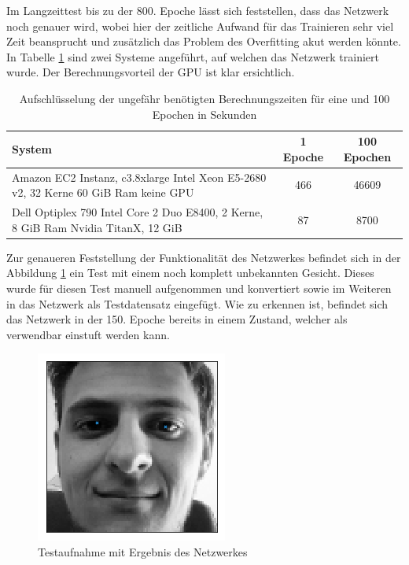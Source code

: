 \noindent
Im Langzeittest bis zu der 800. Epoche lässt sich feststellen, dass das Netzwerk noch genauer wird, wobei hier der zeitliche Aufwand für das Trainieren sehr viel Zeit beansprucht und zusätzlich das Problem des Overfitting akut werden könnte. 
In Tabelle \ref{tab:time} sind zwei Systeme angeführt, auf welchen das Netzwerk trainiert wurde. 
Der Berechnungsvorteil der GPU ist klar ersichtlich. 
\begin{table}[htb]%
\centering
\begin{tabular}{p{7.5cm} c c}
System & 1 Epoche & 100 Epochen \\ 
\hline 
Amazon EC2 Instanz, c3.8xlarge \newline Intel Xeon E5-2680 v2, 32 Kerne 60 GiB Ram \newline keine GPU & 466 & 46609 \\ 
\hline 
Dell Optiplex 790 \newline Intel Core 2 Duo E8400, 2 Kerne, 8 GiB Ram \newline Nvidia TitanX, 12 GiB & 87 & 8700 \\ 
\end{tabular} 
\caption{Aufschlüsselung der ungefähr benötigten Berechnungszeiten für eine und 100 Epochen in Sekunden}
\label{tab:time}
\end{table} \phantom \newline

\noindent
Zur genaueren Feststellung der Funktionalität des Netzwerkes befindet sich in der Abbildung \ref{fig:meTest} ein Test mit einem noch komplett unbekannten Gesicht. 
Dieses wurde für diesen Test manuell aufgenommen und konvertiert sowie im Weiteren in das Netzwerk als Testdatensatz eingefügt. 
Wie zu erkennen ist, befindet sich das Netzwerk in der 150. Epoche bereits in einem Zustand, welcher als verwendbar einstuft werden kann. 
\begin{figure}[ht!]
	\centering
	\includegraphics[scale=0.8]{images/me-test.png}
	\caption{Testaufnahme mit Ergebnis des Netzwerkes}
	\label{fig:meTest}
\end{figure}

